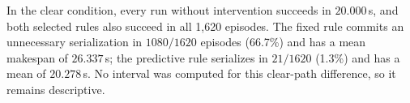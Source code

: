 In the clear condition, every run without intervention succeeds in $20.000$\,s,
and both selected rules also succeed in all 1,620 episodes.  The fixed rule
commits an unnecessary serialization in $1080/1620$ episodes (66.7\%) and has a
mean makespan of $26.337$\,s; the predictive rule serializes in $21/1620$
(1.3\%) and has a mean of $20.278$\,s.  No interval was computed for this
clear-path difference, so it remains descriptive.

